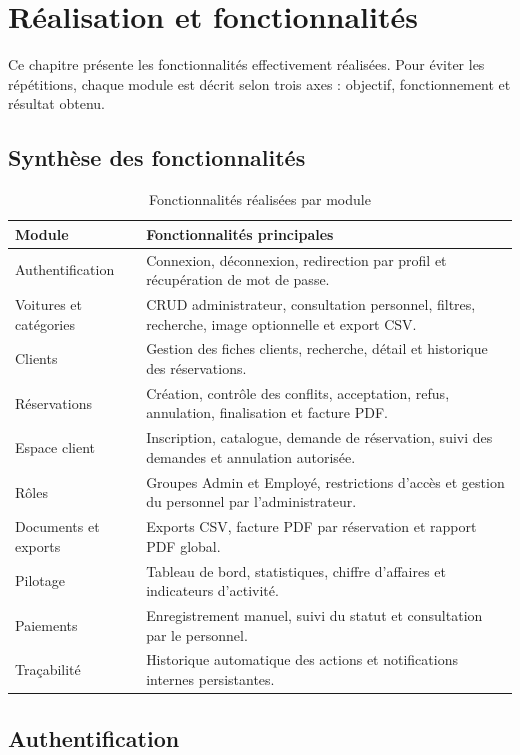 \chapter{Réalisation et fonctionnalités}

Ce chapitre présente les fonctionnalités effectivement réalisées. Pour éviter les répétitions, chaque module est décrit selon trois axes : objectif, fonctionnement et résultat obtenu.

\section{Synthèse des fonctionnalités}

\begin{longtable}{|p{3.4cm}|p{10.8cm}|}
\caption{Fonctionnalités réalisées par module}\\
\hline
\textbf{Module} & \textbf{Fonctionnalités principales} \\
\hline
Authentification & Connexion, déconnexion, redirection par profil et récupération de mot de passe. \\
\hline
Voitures et catégories & CRUD administrateur, consultation personnel, filtres, recherche, image optionnelle et export CSV. \\
\hline
Clients & Gestion des fiches clients, recherche, détail et historique des réservations. \\
\hline
Réservations & Création, contrôle des conflits, acceptation, refus, annulation, finalisation et facture PDF. \\
\hline
Espace client & Inscription, catalogue, demande de réservation, suivi des demandes et annulation autorisée. \\
\hline
Rôles & Groupes Admin et Employé, restrictions d'accès et gestion du personnel par l'administrateur. \\
\hline
Documents et exports & Exports CSV, facture PDF par réservation et rapport PDF global. \\
\hline
Pilotage & Tableau de bord, statistiques, chiffre d'affaires et indicateurs d'activité. \\
\hline
Paiements & Enregistrement manuel, suivi du statut et consultation par le personnel. \\
\hline
Traçabilité & Historique automatique des actions et notifications internes persistantes. \\
\hline
\end{longtable}

\section{Authentification}

